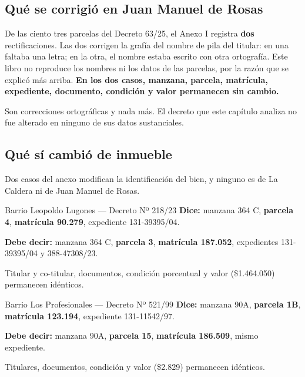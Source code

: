 \subsection*{Qué se corrigió en Juan Manuel de Rosas}

De las ciento tres parcelas del Decreto 63/25, el Anexo I registra \textbf{dos} rectificaciones. Las dos corrigen la grafía del nombre de pila del titular: en una faltaba una letra; en la otra, el nombre estaba escrito con otra ortografía. Este libro no reproduce los nombres ni los datos de las parcelas, por la razón que se explicó más arriba. \textbf{En los dos casos, manzana, parcela, matrícula, expediente, documento, condición y valor permanecen sin cambio.}

Son correcciones ortográficas y nada más. El decreto que este capítulo analiza no fue alterado en ninguno de sus datos sustanciales.

\subsection*{Qué sí cambió de inmueble}

Dos casos del anexo modifican la identificación del bien, y ninguno es de La Caldera ni de Juan Manuel de Rosas.

\begin{ficha}{Barrio Leopoldo Lugones --- Decreto Nº 218/23}
\textbf{Dice:} manzana 364 C, \textbf{parcela 4}, \textbf{matrícula 90.279}, expediente 131-39395/04.

\textbf{Debe decir:} manzana 364 C, \textbf{parcela 3}, \textbf{matrícula 187.052}, expedientes 131-39395/04 y 388-47308/23.

Titular y co-titular, documentos, condición porcentual y valor (\$1.464.050) permanecen idénticos.
\end{ficha}

\begin{ficha}{Barrio Los Profesionales --- Decreto Nº 521/99}
\textbf{Dice:} manzana 90A, \textbf{parcela 1B}, \textbf{matrícula 123.194}, expediente 131-11542/97.

\textbf{Debe decir:} manzana 90A, \textbf{parcela 15}, \textbf{matrícula 186.509}, mismo expediente.

Titulares, documentos, condición y valor (\$2.829) permanecen idénticos.
\end{ficha}

